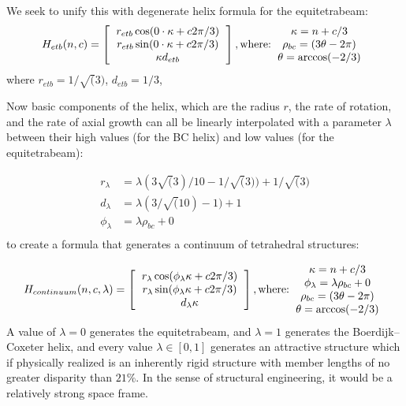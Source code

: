\documentclass[11pt]{article}
\begin{document}
We seek to unify this with degenerate helix formula for the equitetrabeam:
\[
H_{etb}(n,c) =
\left [
  \begin{tabular}{c}
   $ r_{etb}  \cos( 0 \cdot \kappa  + c 2 \pi /3) $\\
   $ r_{etb}  \sin( 0 \cdot \kappa  + c 2 \pi /3) $\\
   $ \kappa d_{etb} $
  \end{tabular}
\right ],
\text{where:}
  \begin{tabular}{c}
 $\kappa = n + c/3$ \\
    $\rho_{bc} = (3 \theta - 2 \pi)$ \\
   $ \theta = \arccos(-2/3) $
  \end{tabular}      
\]
where $ r_{etb} = 1/\sqrt(3)$, $d_{etb} = 1/3$,

Now basic components of the helix, which are the radius $r$, the rate of rotation, and the rate of
axial growth can all be linearly interpolated with a parameter $\lambda$ between their high values (for the BC helix)
and low values (for the equitetrabeam):

\begin{align*}
r_{\lambda}  &=  \lambda (3 \sqrt(3) / 10 - 1/\sqrt(3)) +  1/\sqrt(3) \\
d_{\lambda} &=   \lambda (3 / \sqrt(10) - 1)+ 1 \\
\phi_{\lambda} &=  \lambda \rho_{bc}  + 0\\
\end{align*}
to create a formula that generates a continuum of tetrahedral structures:

\[
H_{continuum}(n,c,\lambda) =
\left [
  \begin{tabular}{c}
   $ r_{\lambda} \cos(\phi_{\lambda} \kappa + c 2 \pi /3) $\\
   $ r_{\lambda}  \sin(\phi_{\lambda} \kappa + c 2 \pi /3) $\\
   $ d_{\lambda} \kappa $
  \end{tabular}
  \right ],
\text{where:}
  \begin{tabular}{c}
    $\kappa = n + c/3$ \\
    $ \phi_{\lambda} =  \lambda \rho_{bc}  + 0 $\\
    $\rho_{bc} = (3 \theta - 2 \pi)$ \\
   $ \theta = \arccos(-2/3) $
  \end{tabular}      
\]
A value of $\lambda = 0$ generates the equitetrabeam, and $\lambda = 1$ generates the Boerdijk--Coxeter helix, and every
value $\lambda \in [0,1]$ generates an attractive structure which if physically realized is an inherently rigid structure
with member lengths of no greater disparity than $21\%$.
In the sense of structural engineering, it would be a relatively strong space frame.
\end{document}
